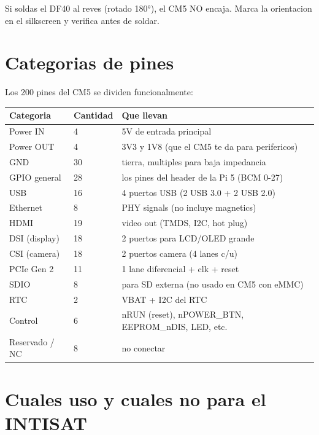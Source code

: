 \documentclass[11pt,a4paper,oneside,openright]{book}
\begin{document}
\begin{cuidado}
Si soldas el DF40 al reves (rotado 180°), el CM5 NO encaja. Marca la
orientacion en el silkscreen y verifica antes de soldar.
\end{cuidado}

\section{Categorias de pines}

Los 200 pines del CM5 se dividen funcionalmente:

\begin{center}
\begin{tabular}{p{4cm}p{2cm}p{8cm}}
\toprule
\textbf{Categoria} & \textbf{Cantidad} & \textbf{Que llevan} \\
\midrule
Power IN              & 4   & 5V de entrada principal \\
Power OUT             & 4   & 3V3 y 1V8 (que el CM5 te da para perifericos) \\
GND                   & 30  & tierra, multiples para baja impedancia \\
GPIO general          & 28  & los pines del header de la Pi 5 (BCM 0-27) \\
USB                   & 16  & 4 puertos USB (2 USB 3.0 + 2 USB 2.0) \\
Ethernet              & 8   & PHY signals (no incluye magnetics) \\
HDMI                  & 19  & video out (TMDS, I2C, hot plug) \\
DSI (display)         & 18  & 2 puertos para LCD/OLED grande \\
CSI (camera)          & 18  & 2 puertos camera (4 lanes c/u) \\
PCIe Gen 2            & 11  & 1 lane diferencial + clk + reset \\
SDIO                  & 8   & para SD externa (no usado en CM5 con eMMC) \\
RTC                   & 2   & VBAT + I2C del RTC \\
Control               & 6   & nRUN (reset), nPOWER\_BTN, EEPROM\_nDIS, LED, etc. \\
Reservado / NC        & 8   & no conectar \\
\bottomrule
\end{tabular}
\end{center}

\section{Cuales uso y cuales no para el INTISAT}
\end{document}
